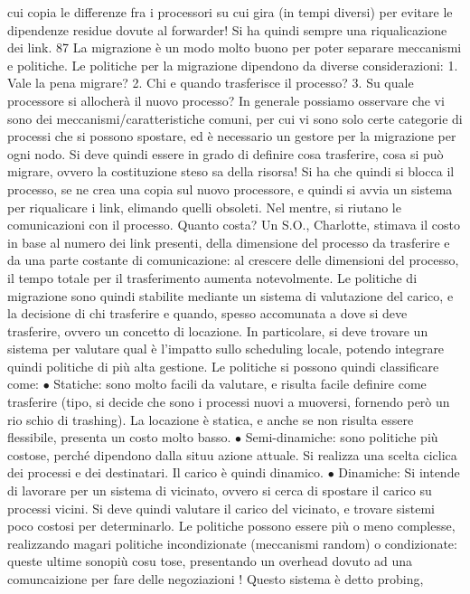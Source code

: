 cui copia le differenze fra i processori su cui gira (in tempi diversi) per evitare
le dipendenze residue dovute al forwarder! Si ha quindi sempre una riqualicazione dei link.
87
La migrazione è un modo molto buono per poter separare meccanismi e
politiche. Le politiche per la migrazione dipendono da diverse considerazioni:
1. Vale la pena migrare?
2. Chi e quando trasferisce il processo?
3. Su quale processore si allocherà il nuovo processo?
In generale possiamo osservare che vi sono dei meccanismi/caratteristiche comuni, per cui vi sono solo certe categorie
di processi che si possono spostare, ed
è necessario un gestore per la migrazione per ogni nodo. Si deve quindi essere in
grado di definire cosa trasferire, cosa si può migrare, ovvero la costituzione steso
sa della risorsa! Si ha che quindi si blocca il processo, se ne crea una copia sul
nuovo processore, e quindi si avvia un sistema per riqualicare i link, elimando
quelli obsoleti. Nel mentre, si riutano le comunicazioni con il processo.
Quanto costa? Un S.O., Charlotte, stimava il costo in base al numero dei
link presenti, della dimensione del processo da trasferire e da una parte costante
di comunicazione: al crescere delle dimensioni del processo, il tempo totale per
il trasferimento aumenta notevolmente.
Le politiche di migrazione sono quindi stabilite mediante un sistema di valutazione del carico, e la decisione di chi
trasferire e quando, spesso accomunata
a dove si deve trasferire, ovvero un concetto di locazione. In particolare, si deve
trovare un sistema per valutare qual è l'impatto sullo scheduling locale, potendo
integrare quindi politiche di più alta gestione. Le politiche si possono quindi
classificare come:
$\bullet$ Statiche: sono molto facili da valutare, e risulta facile definire come trasferire
(tipo, si decide che sono i processi nuovi a muoversi, fornendo però un rio
schio di trashing). La locazione è statica, e anche se non risulta essere
flessibile, presenta un costo molto basso.
$\bullet$ Semi-dinamiche: sono politiche più costose, perché dipendono dalla situu
azione attuale. Si realizza una scelta ciclica dei processi e dei destinatari.
Il carico è quindi dinamico.
$\bullet$ Dinamiche: Si intende di lavorare per un sistema di vicinato, ovvero si
cerca di spostare il carico su processi vicini. Si deve quindi valutare il
carico del vicinato, e trovare sistemi poco costosi per determinarlo.
Le politiche possono essere più o meno complesse, realizzando magari politiche
incondizionate (meccanismi random) o condizionate: queste ultime sonopiù cosu
tose, presentando un overhead dovuto ad una comuncaizione per fare delle negoziazioni ! Questo sistema è detto probing,
